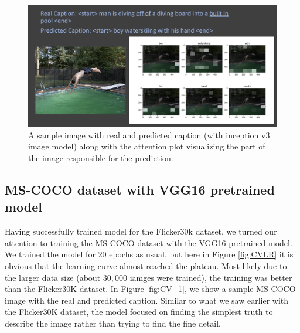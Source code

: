 \documentclass[12pt]{article}
\begin{document}
\begin{figure}[h!]
\begin{center}
\includegraphics[width=7in]{FI_2.png}
\end{center}
\caption{\label{fig:FI_2}
A sample image with real and predicted caption (with inception v3 image model) along with the attention plot visualizing the part of the image responsible for the prediction.}
\end{figure}

\subsection{MS-COCO dataset with VGG16 pretrained model}
\label{sec:imfeat}

Having successfully trained model for the Flicker30k dataset, we turned our attention to training the MS-COCO dataset with the VGG16 pretrained model. We trained the model for 20 epochs as usual, but here in Figure \ref{fig:CVLR} it is obvious that the learning curve almost reached the plateau. Most likely due to the larger data size (about $30,000$ iamges were trained), the training was better than the Flicker30K dataset. In Figure \ref{fig:CV_1}, we show a sample MS-COCO image with the real and predicted caption. Similar to what we saw earlier with the Flicker30K dataset, the model focused on finding the simplest truth to describe the image rather than trying to find the fine detail.
\end{document}
